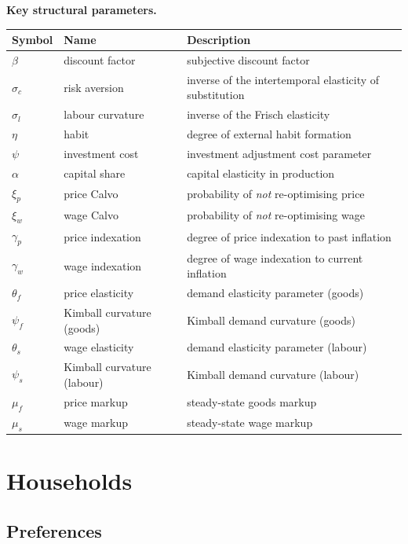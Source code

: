 \documentclass[11pt,a4paper]{article}
\begin{document}
\noindent\textbf{Key structural parameters.}
\begin{center}
\begin{tabular}{lll}
\toprule
\textbf{Symbol} & \textbf{Name} & \textbf{Description} \\
\midrule
$\beta$ & discount factor & subjective discount factor \\
$\sigma_c$ & risk aversion & inverse of the intertemporal elasticity of substitution \\
$\sigma_l$ & labour curvature & inverse of the Frisch elasticity \\
$\eta$ & habit & degree of external habit formation \\
$\psi$ & investment cost & investment adjustment cost parameter \\
$\alpha$ & capital share & capital elasticity in production \\
$\xi_p$ & price Calvo & probability of \emph{not} re-optimising price \\
$\xi_w$ & wage Calvo & probability of \emph{not} re-optimising wage \\
$\gamma_p$ & price indexation & degree of price indexation to past inflation \\
$\gamma_w$ & wage indexation & degree of wage indexation to current inflation \\
$\theta_f$ & price elasticity & demand elasticity parameter (goods) \\
$\psi_f$ & Kimball curvature (goods) & Kimball demand curvature (goods) \\
$\theta_s$ & wage elasticity & demand elasticity parameter (labour) \\
$\psi_s$ & Kimball curvature (labour) & Kimball demand curvature (labour) \\
$\mu_f$ & price markup & steady-state goods markup \\
$\mu_s$ & wage markup & steady-state wage markup \\
\bottomrule
\end{tabular}
\end{center}


\section{Households}
\label{sec:households}

\subsection{Preferences}
\end{document}
